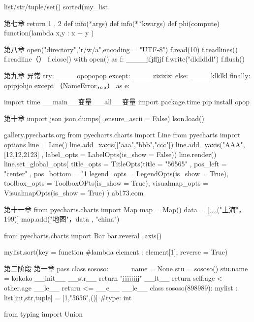 list/str/tuple/set()  %
sorted(my_list%

第七章  
return 1 , 2
def info(*args) %
def info(**kwargs)  %
def phi(compute)   %
function(lambda x,y : x + y )  %

第八章
open("directory","r/w/a",encoding = "UTF-8")  %
f.read(10)  %
f.readlines()  %
f.readline（）  %
f.close()
with open() as f:  %
____jfjffjjf  
f.write("dldldldl")  %
f.flush()   %

第九章  异常
try:
____opopopop
except:
____zizizizi
else:
____klklkl
finally:
opipjohjo
except （NameError，。。） as e:  %

import time  %
__main__变量  %
__all__变量   %
import package.time
pip install opop 

第十章
import json
json.dumps(  ,ensure_ascii = False)  %
lson.load()  %

gallery.pyecharts.org   %
from pyecharts.charts import Line
from pyecharts import options
line = Line()
line.add_xaxis(["aaa","bbb","ccc"])
line.add_yaxis("AAA",[12,12,2123] , label_opts = LabelOpts(is_show = False))
line.render()
line.set_global_opts(
    title_opts = TitleOpts(title = "56565" , pos_left = "center" , pos_bottom = "1%
    legend_opts = LegendOpts(is_show = True),
    toolbox_opts = ToolboxOPts(is_show = True),
    visualmap_opts = VisualmapOpts(is_show = True)
)
ab173.com

第十一章
from pyecharts.charts import Map
map = Map()
data = [,,,,("上海"， 199)]
map.add("地图"，data , "china")

from pyecharts.charts import Bar
bar.reveral_axis()

mylist.sort(key = function #lambda element : element[1], reverse = True)

第二阶段   
第一章
pass
class sososo:   %
____name = None
stu = sososo()
stu.name = kokoko
 __init__
__str__    %
    return "jjjjjjjj"
__lt__
    return self.age < other.age
__le__
    return         <=
__e__
__le__
class sososo(898989):      %
mylist : list[int,str,tuple] = [1,"5656",()]   #type: int

from typing import Union %






